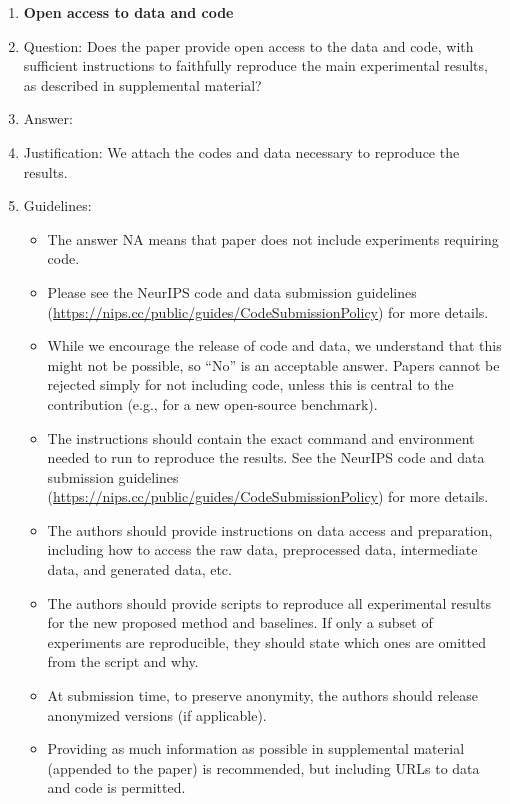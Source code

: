 \documentclass{article}
\begin{document}
\begin{enumerate}
\item {\bf Open access to data and code}
    \item[] Question: Does the paper provide open access to the data and code, with sufficient instructions to faithfully reproduce the main experimental results, as described in supplemental material?
    \item[] Answer: \answerYes{} %
    \item[] Justification: We attach the codes and data necessary to reproduce the results.
    \item[] Guidelines:
    \begin{itemize}
        \item The answer NA means that paper does not include experiments requiring code.
        \item Please see the NeurIPS code and data submission guidelines (\url{https://nips.cc/public/guides/CodeSubmissionPolicy}) for more details.
        \item While we encourage the release of code and data, we understand that this might not be possible, so “No” is an acceptable answer. Papers cannot be rejected simply for not including code, unless this is central to the contribution (e.g., for a new open-source benchmark).
        \item The instructions should contain the exact command and environment needed to run to reproduce the results. See the NeurIPS code and data submission guidelines (\url{https://nips.cc/public/guides/CodeSubmissionPolicy}) for more details.
        \item The authors should provide instructions on data access and preparation, including how to access the raw data, preprocessed data, intermediate data, and generated data, etc.
        \item The authors should provide scripts to reproduce all experimental results for the new proposed method and baselines. If only a subset of experiments are reproducible, they should state which ones are omitted from the script and why.
        \item At submission time, to preserve anonymity, the authors should release anonymized versions (if applicable).
        \item Providing as much information as possible in supplemental material (appended to the paper) is recommended, but including URLs to data and code is permitted.
    \end{itemize}



\end{enumerate}
\end{document}
